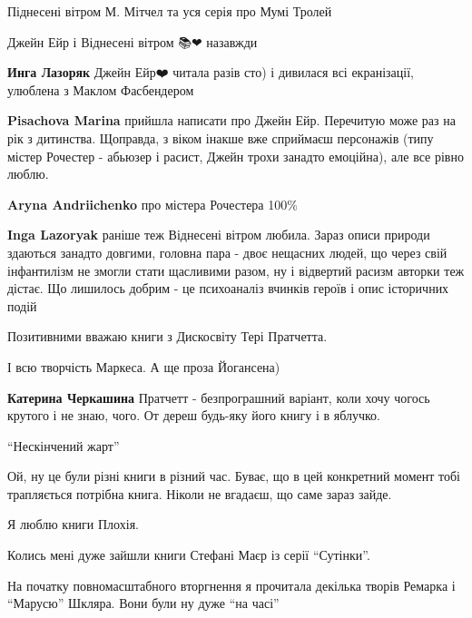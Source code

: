 Піднесені вітром М. Мітчел та уся серія про Мумі Тролей


Джейн Ейр і Віднесені вітром 📚❤ назавжди

\begin{itemize} %
\textbf{Инга Лазоряк} Джейн Ейр❤️ читала разів сто) і дивилася всі екранізації, улюблена з Маклом Фасбендером

\textbf{Pisachova Marina} прийшла написати про Джейн Ейр. Перечитую може раз на рік з дитинства. Щоправда, з віком інакше вже сприймаєш персонажів (типу містер Рочестер - абьюзер і расист, Джейн трохи занадто емоційна), але все рівно люблю.

\textbf{Aryna Andriichenko} про містера Рочестера 100\%

\textbf{Inga Lazoryak} раніше теж Віднесені вітром любила. Зараз описи природи здаються занадто довгими, головна пара - двоє нещасних людей, що через свій інфантилізм не змогли стати щасливими разом, ну і відвертий расизм авторки теж дістає. Що лишилось добрим - це психоаналіз вчинків героїв і опис історичних подій
\end{itemize} %


Позитивними вважаю книги з Дискосвіту Тері Пратчетта.

І всю творчість Маркеса. А ще проза Йогансена)

\begin{itemize} %
\textbf{Катерина Черкашина} Пратчетт - безпрограшний варіант, коли хочу чогось крутого і не знаю, чого. От дереш будь-яку його книгу і в яблучко.
\end{itemize} %


\enquote{Нескінчений жарт}


Ой, ну це були різні книги в різний час. Буває, що в цей конкретний момент тобі
трапляється потрібна книга. Ніколи не вгадаєш, що саме зараз зайде.

Я люблю книги Плохія.

Колись мені дуже зайшли книги Стефані Маєр із серії \enquote{Сутінки}.

На початку повномасштабного вторгнення я прочитала декілька творів Ремарка і
\enquote{Марусю} Шкляра. Вони були ну дуже \enquote{на часі}

